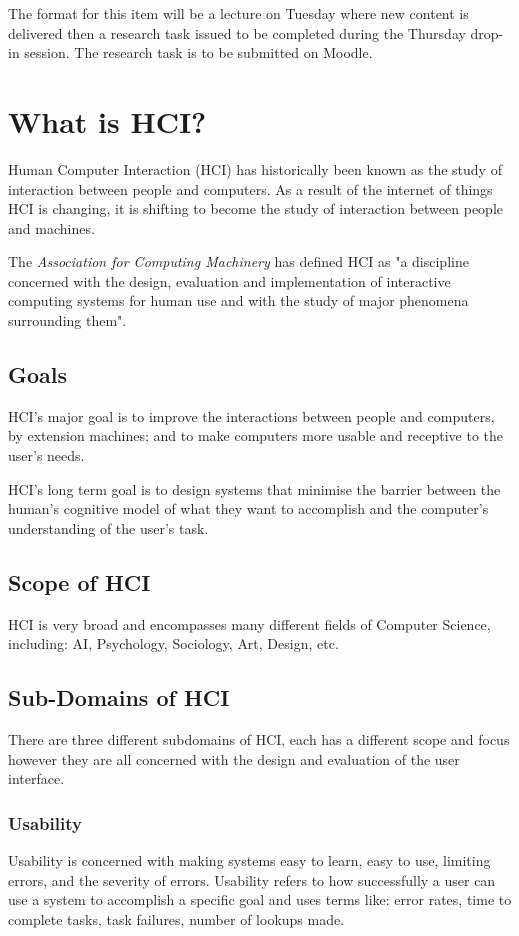 
The format for this item will be a lecture on Tuesday where new content is delivered then a research task issued to be completed during the Thursday drop-in session. The research task is to be submitted on Moodle.

\section{What is HCI?}
Human Computer Interaction (HCI) has historically been known as the study of interaction between people and computers. As a result of the internet of things HCI is changing, it is shifting to become the study of interaction between people and machines. 

The \textit{Association for Computing Machinery} has defined HCI as "a discipline concerned with the design, evaluation and implementation of interactive computing systems for human use and with the study of major phenomena surrounding them".

\subsection{Goals}
HCI's major goal is to improve the interactions between people and computers, by extension machines; and to make computers more usable and receptive to the user's needs.

HCI's long term goal is to design systems that minimise the barrier between the human's cognitive model of what they want to accomplish and the computer's understanding of the user's task. 

\subsection{Scope of HCI}
HCI is very broad and encompasses many different fields of Computer Science, including: AI, Psychology, Sociology, Art, Design, etc. 

\subsection{Sub-Domains of HCI}
There are three different subdomains of HCI, each has a different scope and focus however they are all concerned with the design and evaluation of the user interface.
\subsubsection{Usability}
Usability is concerned with making systems easy to learn, easy to use, limiting errors, and the severity of errors. Usability refers to how successfully a user can use a system to accomplish a specific goal and uses terms like: error rates, time to complete tasks, task failures, number of lookups made.
